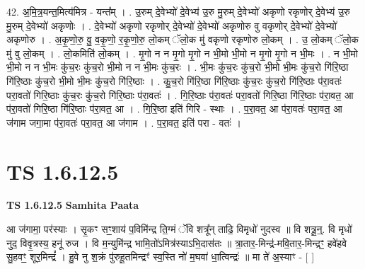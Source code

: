 \documentclass[17pt]{extarticle}
\begin{document}
42. अ॒मि॒त्र॒यन्त॒मित्य॑मित्र - यन्त᳚म् । . उ॒रुम् दे॒वेभ्यो॑ दे॒वेभ्य॑ उ॒रु मु॒रुम् दे॒वेभ्यो॑ अकृणो रकृणोर् दे॒वेभ्य॑ उ॒रु मु॒रुम् दे॒वेभ्यो॑ अकृणोः । . दे॒वेभ्यो॑ अकृणो रकृणोर् दे॒वेभ्यो॑ दे॒वेभ्यो॑ अकृणोरु वु वकृणोर् दे॒वेभ्यो॑ दे॒वेभ्यो॑ अकृणोरु । . अ॒कृ॒णो॒रु॒ वु॒ व॒कृ॒णो॒ र॒कृ॒णो॒रु॒ लो॒कम् ॅलो॒क मु॑ वकृणो रकृणोरु लो॒कम् । . उ॒ लो॒कम् ॅलो॒क मु॑ वु लो॒कम् । . लो॒कमिति॑ लो॒कम् । . मृ॒गो न न मृ॒गो मृ॒गो न भी॒मो भी॒मो न मृ॒गो मृ॒गो न भी॒मः । . न भी॒मो भी॒मो न न भी॒मः कु॑च॒रः कु॑च॒रो भी॒मो न न भी॒मः कु॑च॒रः । . भी॒मः कु॑च॒रः कु॑च॒रो भी॒मो भी॒मः कु॑च॒रो गि॑रि॒ष्ठा गि॑रि॒ष्ठाः कु॑च॒रो भी॒मो भी॒मः कु॑च॒रो गि॑रि॒ष्ठाः । . कु॒च॒रो गि॑रि॒ष्ठा गि॑रि॒ष्ठाः कु॑च॒रः कु॑च॒रो गि॑रि॒ष्ठाः प॑रा॒वतः॑ परा॒वतो॑ गिरि॒ष्ठाः कु॑च॒रः कु॑च॒रो गि॑रि॒ष्ठाः प॑रा॒वतः॑ । . गि॒रि॒ष्ठाः प॑रा॒वतः॑ परा॒वतो॑ गिरि॒ष्ठा गि॑रि॒ष्ठाः प॑रा॒वत॒ आ प॑रा॒वतो॑ गिरि॒ष्ठा गि॑रि॒ष्ठाः प॑रा॒वत॒ आ । . गि॒रि॒ष्ठा इति॑ गिरि - स्थाः । . प॒रा॒वत॒ आ प॑रा॒वतः॑ परा॒वत॒ आ ज॑गाम जगा॒मा प॑रा॒वतः॑ परा॒वत॒ आ ज॑गाम । . प॒रा॒वत॒ इति॑ परा - वतः॑ । \newline
\pagebreak
{}
\section*{ TS 1.6.12.5 }

\textbf{TS 1.6.12.5 } \newline
\textbf{Samhita Paata} \newline

आ ज॑गामा॒ पर॑स्याः । सृ॒कꣳ सꣳ॒॒शाय॑ प॒विमि॑न्द्र ति॒ग्मं ॅवि शत्रू᳚न् ताढि॒ विमृधो॑ नुदस्व ॥ वि शत्रू॒न्॒. वि मृधो॑ नुद॒ विवृ॒त्रस्य॒ हनू॑ रुज । वि म॒न्युमि॑न्द्र भामि॒तो॑ऽमित्र॑स्याऽभि॒दास॑तः ॥ त्रा॒तार॒-मिन्द्र॑-मवि॒तार॒-मिन्द्रꣳ॒॒ हवे॑हवे सु॒हवꣳ॒॒ शूर॒मिन्द्रं᳚ । हु॒वे नु श॒क्रं पु॑रुहू॒तमिन्द्रꣳ॑ स्व॒स्ति नो॑ म॒घवा॑ धा॒त्विन्द्रः॑ ॥ मा ते॑ अ॒स्याꣳ - [ ] \newline
\end{document}
